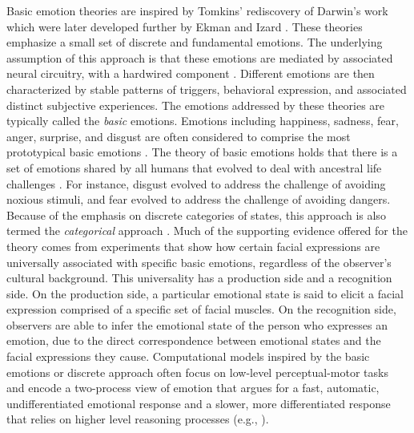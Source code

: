 \documentclass[12pt]{report}
\begin{document}
Basic emotion theories are inspired by Tomkins' \cite{tomkins:affect}
rediscovery of Darwin's work
\cite{darwin:emotion-expression,hess:darwin-emotion} which were later developed
further by Ekman \cite{ekman:argument-emotions} and Izard
\cite{izard:human-emotions}. These theories emphasize a small set of discrete
and fundamental emotions. The underlying assumption of this approach is that
these emotions are mediated by associated neural circuitry, with a hardwired
component \cite{ekman:argument-emotions}. Different emotions are then
characterized by stable patterns of triggers, behavioral expression, and
associated distinct subjective experiences. The emotions addressed by these
theories are typically called the \textit{basic} emotions. Emotions including
happiness, sadness, fear, anger, surprise, and disgust are often considered to
comprise the most prototypical basic emotions \cite{ekman:argument-emotions}.
The theory of basic emotions holds that there is a set of emotions shared by all
humans that evolved to deal with ancestral life challenges
\cite{ekman:argument-emotions}. For instance, disgust evolved to address the
challenge of avoiding noxious stimuli, and fear evolved to address the challenge
of avoiding dangers. Because of the emphasis on discrete categories of states,
this approach is also termed the \textit{categorical} approach
\cite{panskepp:affective-neuroscience}. Much of the supporting evidence offered
for the theory comes from experiments that show how certain facial expressions
are universally associated with specific basic emotions, regardless of the
observer's cultural background. This universality has a production side and a
recognition side. On the production side, a particular emotional state is said
to elicit a facial expression comprised of a specific set of facial muscles. On
the recognition side, observers are able to infer the emotional state of the
person who expresses an emotion, due to the direct correspondence between
emotional states and the facial expressions they cause. Computational models
inspired by the basic emotions or discrete approach often focus on low-level
perceptual-motor tasks and encode a two-process view of emotion that argues for
a fast, automatic, undifferentiated emotional response and a slower, more
differentiated response that relies on higher level reasoning processes (e.g.,
\cite{armony:computational-modeling-emotion}). \\

\end{document}

